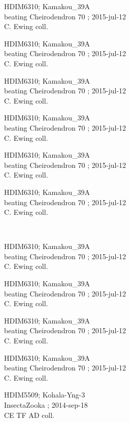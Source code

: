 \documentclass[2pt]{extarticle}
\begin{document}
\noindent
\parbox{0.16\textwidth}{\tiny \raggedright \rule[-0.3\baselineskip]{0pt}{10pt}HDIM6310; Kamakou\_39A\\ beating Cheirodendron 70 ; 2015-jul-12\\ C. Ewing coll.}
\parbox{0.16\textwidth}{\tiny \raggedright \rule[-0.3\baselineskip]{0pt}{10pt}HDIM6310; Kamakou\_39A\\ beating Cheirodendron 70 ; 2015-jul-12\\ C. Ewing coll.}
\parbox{0.16\textwidth}{\tiny \raggedright \rule[-0.3\baselineskip]{0pt}{10pt}HDIM6310; Kamakou\_39A\\ beating Cheirodendron 70 ; 2015-jul-12\\ C. Ewing coll.}
\parbox{0.16\textwidth}{\tiny \raggedright \rule[-0.3\baselineskip]{0pt}{10pt}HDIM6310; Kamakou\_39A\\ beating Cheirodendron 70 ; 2015-jul-12\\ C. Ewing coll.}
\parbox{0.16\textwidth}{\tiny \raggedright \rule[-0.3\baselineskip]{0pt}{10pt}HDIM6310; Kamakou\_39A\\ beating Cheirodendron 70 ; 2015-jul-12\\ C. Ewing coll.}
\parbox{0.16\textwidth}{\tiny \raggedright \rule[-0.3\baselineskip]{0pt}{10pt}HDIM6310; Kamakou\_39A\\ beating Cheirodendron 70 ; 2015-jul-12\\ C. Ewing coll.} \\ 
\vspace{0.001in} 

\noindent
\parbox{0.16\textwidth}{\tiny \raggedright \rule[-0.3\baselineskip]{0pt}{10pt}HDIM6310; Kamakou\_39A\\ beating Cheirodendron 70 ; 2015-jul-12\\ C. Ewing coll.}
\parbox{0.16\textwidth}{\tiny \raggedright \rule[-0.3\baselineskip]{0pt}{10pt}HDIM6310; Kamakou\_39A\\ beating Cheirodendron 70 ; 2015-jul-12\\ C. Ewing coll.}
\parbox{0.16\textwidth}{\tiny \raggedright \rule[-0.3\baselineskip]{0pt}{10pt}HDIM6310; Kamakou\_39A\\ beating Cheirodendron 70 ; 2015-jul-12\\ C. Ewing coll.}
\parbox{0.16\textwidth}{\tiny \raggedright \rule[-0.3\baselineskip]{0pt}{10pt}HDIM6310; Kamakou\_39A\\ beating Cheirodendron 70 ; 2015-jul-12\\ C. Ewing coll.}
\parbox{0.16\textwidth}{\tiny \raggedright \rule[-0.3\baselineskip]{0pt}{10pt}HDIM5509; Kohala-Yng-3\\ InsectaZooka  ; 2014-sep-18\\ CE TF AD coll.}
\end{document}
